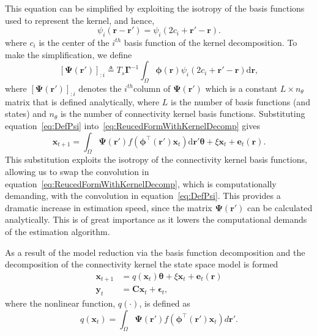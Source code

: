 \documentclass[]{article}
\begin{document}
This equation can be simplified by exploiting the isotropy of the basis functions used to represent the kernel, and hence,
\begin{equation}
	\psi_i (\mathbf{r}-\mathbf{r}') = \psi_i (2c_i+\mathbf{r}'-\mathbf{r}).
\end{equation}
where $c_i$ is the center of the $i^{th}$ basis function of the kernel decomposition. To make the simplification, we define
\begin{equation}\label{eq:DefPsi}
	\left[ \boldsymbol\Psi(\mathbf{r}')\right]_{:i}  \triangleq T_s\boldsymbol{\Gamma}^{-1}\int_\Omega {\boldsymbol{\phi}(\mathbf{r})\psi_i (2c_i+\mathbf{r}'-\mathbf{r})\textrm{d}\mathbf{r}},
\end{equation}
where $\left[ \boldsymbol\Psi(\mathbf{r}')\right]_{:i}$ denotes the $i^{th}$column of $\boldsymbol{\Psi}(\mathbf{r}')$ which is a constant $L \times n_{\theta}$ matrix that is defined analytically, where $L$ is the number of basis functions (and states) and $n_{\theta}$ is the number of connectivity kernel basis functions. Substituting equation~\ref{eq:DefPsi} into~\ref{eq:ReucedFormWithKernelDecomp} gives
\begin{equation}
	\mathbf{x}_{t+1} = \int_\Omega \boldsymbol{\Psi}(\mathbf{r}') f(\boldsymbol{\phi}^{\top}(\mathbf{r}')\mathbf{x}_t) \textrm{d}\mathbf{r}' \boldsymbol{\theta} + \xi\mathbf{x}_t 
+ \mathbf{e}_t(\mathbf{r}).
\end{equation}
This substitution exploits the isotropy of the connectivity kernel basis functions, allowing us to swap the convolution in equation~\ref{eq:ReucedFormWithKernelDecomp}, which is computationally demanding, with the convolution in equation~\ref{eq:DefPsi}. This provides a dramatic increase in estimation speed, since the matrix $\boldsymbol\Psi(\mathbf{r}')$ can be calculated analytically. This is of great importance as it lowers the computational demands of the estimation algorithm.

As a result of the model reduction via the basis function decomposition and the decomposition of the connectivity kernel the state space model is formed
\begin{align}
 \mathbf x_{t+1}&=q(\mathbf x_t)\boldsymbol\theta+\xi \mathbf x_t+\boldsymbol e_t(\mathbf r) \label{eq:StateEq} \\
 \mathbf y_t&=\mathbf C \mathbf x_t+\boldsymbol \epsilon_t,\label{eq:OutputEq}
\end{align}
where the nonlinear function, $q(\cdot)$, is defined as
\begin{equation}\label{eq:QmatrixForSigmapoints}
	q(\mathbf{x}_t) = \int_\Omega \boldsymbol{\Psi}(\mathbf{r}') f(\boldsymbol{\phi}^{\top}(\mathbf{r}')\mathbf{x}_t) d\mathbf{r}'.
\end{equation}
\end{document}
